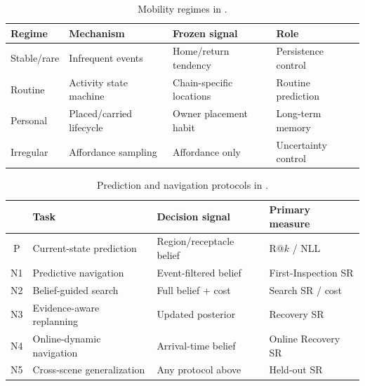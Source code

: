 \begin{table}[!htbp]
\caption{Mobility regimes in \evolvingworldbench{}.}
\label{tab:mobility-regimes}
\centering
\scriptsize
\setlength{\tabcolsep}{3.5pt}
\begin{tabularx}{\linewidth}{lXXX}
\toprule
\textbf{Regime} & \textbf{Mechanism} & \textbf{Frozen signal} & \textbf{Role}\\
\midrule
Stable/rare & Infrequent events & Home/return tendency & Persistence control\\
Routine & Activity state machine & Chain-specific locations & Routine prediction\\
Personal & Placed/carried lifecycle & Owner placement habit & Long-term memory\\
Irregular & Affordance sampling & Affordance only & Uncertainty control\\
\bottomrule
\end{tabularx}
\end{table}

\begin{table}[!htbp]
\caption{Prediction and navigation protocols in \evolvingworldbench{}.}
\label{tab:tasks}
\centering
\scriptsize
\setlength{\tabcolsep}{3.5pt}
\begin{tabularx}{\linewidth}{cXXX}
\toprule
& \textbf{Task} & \textbf{Decision signal} & \textbf{Primary measure}\\
\midrule
P   & Current-state prediction & Region/receptacle belief & R@$k$ / NLL\\
N1  & Predictive navigation & Event-filtered belief & First-Inspection SR\\
N2  & Belief-guided search & Full belief + cost & Search SR / cost\\
N3  & Evidence-aware replanning & Updated posterior & Recovery SR\\
N4  & Online-dynamic navigation & Arrival-time belief & Online Recovery SR\\
N5  & Cross-scene generalization & Any protocol above & Held-out SR\\
\bottomrule
\end{tabularx}
\end{table}
\FloatBarrier
